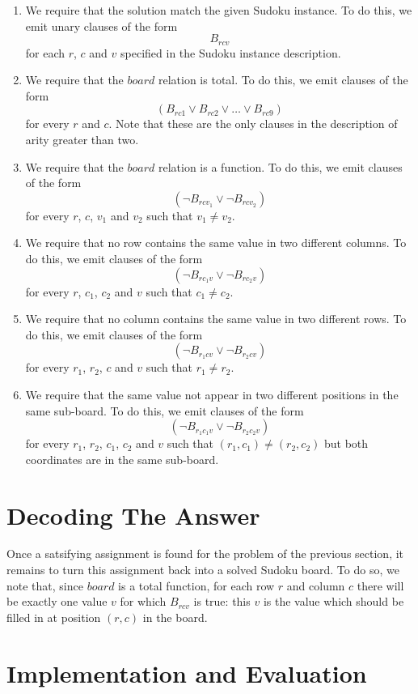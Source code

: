 \documentclass{article}
\begin{document}
\begin{enumerate}
\item We require that the
  solution match the given Sudoku instance. To do this,
  we emit unary clauses of the form $$
    B_{rcv}
  $$ for each $r$, $c$ and $v$ specified in the Sudoku
    instance description.
\item We require that the $board$ relation
  is total. To do this, we emit clauses of the form $$
    (B_{rc1} \lor B_{rc2} \lor \ldots \lor B_{rc9})
  $$ for every $r$ and $c$. Note that these are the
  only clauses in the description of arity greater than two.
\item We require that the $board$ relation
  is a function. To do this, we emit clauses of the form $$
    (\lnot B_{rcv_1} \lor \lnot B_{rcv_2})
  $$ for every $r$, $c$, $v_1$ and $v_2$ such that $v_1 \neq v_2$.
\item We require that no row contains the same value
  in two different columns. To do this, we emit clauses of
  the form $$
    (\lnot B_{rc_1v} \lor \lnot B_{rc_2v})
  $$ for every $r$, $c_1$, $c_2$ and $v$ such that $c_1 \neq c_2$.
\item We require that no column contains the same value
  in two different rows. To do this, we emit clauses of
  the form $$
    (\lnot B_{r_1cv} \lor \lnot B_{r_2cv})
  $$ for every $r_1$, $r_2$, $c$ and $v$ such that $r_1 \neq r_2$.
\item We require that the same value not appear in two
  different positions in the same sub-board. To do this, we
  emit clauses of the form $$
    (\lnot B_{r_1c_1v} \lor \lnot B_{r_2c_2v})
  $$ for every $r_1$, $r_2$, $c_1$, $c_2$ and $v$ such that
  $(r_1, c_1) \neq (r_2, c_2)$ but both coordinates are in
  the same sub-board.
\end{enumerate}

\section{Decoding The Answer}

Once a satsifying assignment is found for the problem of the
previous section, it remains to turn this assignment back
into a solved Sudoku board. To do so, we note that, since
$board$ is a total function, for each row $r$ and column
$c$ there will be exactly one value $v$ for which $B_{rcv}$
is true: this $v$ is the value which should be filled in
at position $(r, c)$ in the board.

\section{Implementation and Evaluation}
\end{document}
